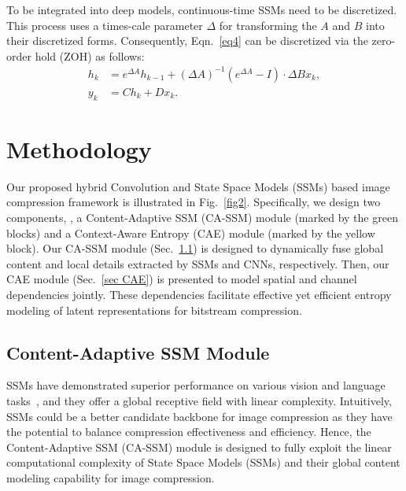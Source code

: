 To be integrated into deep models, continuous-time SSMs need to be discretized. 
This process uses a times-cale parameter $\Delta$ for transforming the $A$ and $B$ into their discretized forms.
Consequently, Eqn.~\eqref{eq4} can be discretized via the zero-order hold (ZOH) as follows:
\begin{equation}
\begin{aligned}
h_k &= e^{\Delta A} h_{k-1} + (\Delta A)^{-1} (e^{\Delta A} - I) \cdot \Delta B x_k, \\
y_k &= C h_k + D x_k.
\end{aligned}
\label{eq5}
\end{equation}


\section{Methodology}
Our proposed hybrid Convolution and State Space Models (SSMs) based image compression framework is illustrated in Fig.~\ref{fig2}.
Specifically, we design two components, \ie, a Content-Adaptive SSM (CA-SSM) module (marked by the green blocks) and a Context-Aware Entropy (CAE) module (marked by the yellow block).
Our CA-SSM module (Sec.~\ref{sec CA-SSM}) is designed to dynamically fuse global content and local details extracted by SSMs and CNNs, respectively.
Then, our CAE module (Sec.~\ref{sec CAE}) is presented to model spatial and channel dependencies jointly.
These dependencies facilitate effective yet efficient entropy modeling of latent representations for bitstream compression.


\subsection{Content-Adaptive SSM Module}
\label{sec CA-SSM}

SSMs have demonstrated superior performance on various vision and language tasks~\cite{gu2023mamba, zhu2024vision, liu2024vmamba, guo2024mambair}, and they offer a global receptive field with linear complexity. 
Intuitively, SSMs could be a better candidate backbone for image compression as they have the potential to balance compression effectiveness and efficiency.
Hence, the Content-Adaptive SSM (CA-SSM) module is designed to fully exploit the linear computational complexity of State Space Models (SSMs) and their global content modeling capability for image compression.


